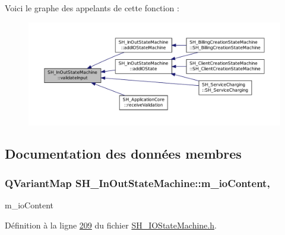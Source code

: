 Voici le graphe des appelants de cette fonction \-:
\nopagebreak
\begin{figure}[H]
\begin{center}
\leavevmode
\includegraphics[width=350pt]{classSH__InOutStateMachine_a5a5804bd32a04d25926f6e323b906887_icgraph}
\end{center}
\end{figure}




\subsection{Documentation des données membres}
\hypertarget{classSH__InOutStateMachine_a661a1c7bd3b1086b3b5cd60ca957ecbd}{
\subsubsection[{m\-\_\-io\-Content}]{\setlength{\rightskip}{0pt plus 5cm}Q\-Variant\-Map S\-H\-\_\-\-In\-Out\-State\-Machine\-::m\-\_\-io\-Content\hspace{0.3cm}{\ttfamily [protected]}, {\ttfamily [inherited]}}}\label{classSH__InOutStateMachine_a661a1c7bd3b1086b3b5cd60ca957ecbd}


m\-\_\-io\-Content 



Définition à la ligne \hyperlink{SH__IOStateMachine_8h_source_l00209}{209} du fichier \hyperlink{SH__IOStateMachine_8h_source}{S\-H\-\_\-\-I\-O\-State\-Machine.\-h}.



